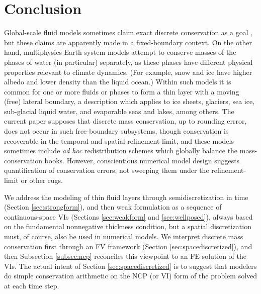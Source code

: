 \documentclass[final,onefignum]{siamart190516}
\begin{document}
\section{Conclusion} \label{sec:conclusion}

Global-scale fluid models sometimes claim exact discrete conservation as a goal \cite{Ringleretal2013,Thuburn2008}, but these claims are apparently made in a fixed-boundary context.  On the other hand, multiphysics Earth system models attempt to conserve masses of the phases of water (in particular) separately, as these phases have different physical properties relevant to climate dynamics.  (For example, snow and ice have higher albedo and lower density than the liquid ocean.)  Within such models it is common for one or more fluids or phases to form a thin layer with a moving (free) lateral boundary, a description which applies to ice sheets, glaciers, sea ice, sub-glacial liquid water, and evaporable seas and lakes, among others.  The current paper supposes that discrete mass conservation, up to rounding errror, does not occur in such free-boundary subsystems, though conservation is recoverable in the temporal and spatial refinement limit, and these models sometimes include \emph{ad hoc} redistribution schemes which globally balance the mass-conservation books.  However, conscientious numerical model design suggests quantification of conservation errors, not sweeping them under the refinement-limit or other rugs.

We address the modeling of thin fluid layers through semidiscretization in time (Section \ref{sec:strongform}), and then weak formulation as a sequence of continuous-space VIs (Sections \ref{sec:weakform} and \ref{sec:wellposed}), always based on the fundamental nonnegative thickness condition, but a spatial discretization must, of course, also be used in numerical models.  We interpret discrete mass conservation first through an FV framework (Section \ref{sec:spacediscretized}), and then Subsection \ref{subsec:ncp} reconciles this viewpoint to an FE solution of the VIs.  The actual intent of Section \ref{sec:spacediscretized} is to suggest that modelers do simple conservation arithmetic on the NCP (or VI) form of the problem solved at each time step.
\end{document}
